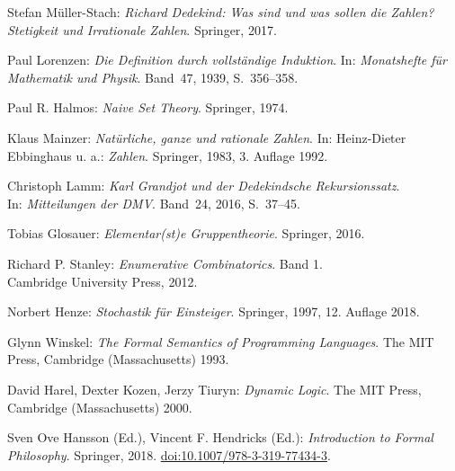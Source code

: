\begin{thebibliography}{00}
 Stefan Müller-Stach:
\emph{Richard Dedekind: Was sind und was sollen die Zahlen?
Stetigkeit und Irrationale Zahlen}. Springer, 2017.

 Paul Lorenzen:
\emph{Die Definition durch vollständige Induktion}.
In: \emph{Monatshefte für Mathematik und Physik}.
Band~47, 1939, S.~356--358.

 Paul R. Halmos:
\emph{Naive Set Theory}. Springer, 1974.

 Klaus Mainzer:
\emph{Natürliche, ganze und rationale Zahlen}.
In: Heinz-Dieter Ebbinghaus u. a.: \emph{Zahlen}.
Springer, 1983, 3. Auflage 1992.

 Christoph Lamm:
\emph{Karl Grandjot und der Dedekindsche Rekursionssatz}.\\
In: \emph{Mitteilungen der DMV}. Band~24, 2016, S.~37--45.

 Tobias Glosauer:
\emph{Elementar(st)e Gruppentheorie}.
Springer, 2016.

 Richard P. Stanley:
\emph{Enumerative Combinatorics}. Band 1.\\
Cambridge University Press, 2012.

 Norbert Henze: \emph{Stochastik für Einsteiger}.
Springer, 1997, 12. Auflage 2018.

 Glynn Winskel:
\emph{The Formal Semantics of Programming Languages}.
The MIT Press, Cambridge (Massachusetts) 1993.

 David Harel, Dexter Kozen, Jerzy Tiuryn:
\emph{Dynamic Logic}.
The MIT Press, Cambridge (Massachusetts) 2000.

 Sven Ove Hansson (Ed.), Vincent F. Hendricks (Ed.):
\emph{Introduction to Formal Philosophy}. Springer, 2018.
\href{https://doi.org/10.1007/978-3-319-77434-3}{doi:10.1007/978-3-319-77434-3}.

\end{thebibliography}
